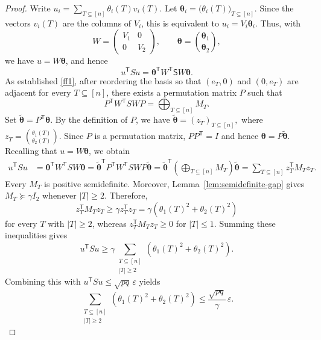 \documentclass[11pt]{article}
\numberwithin{equation}{section}
\theoremstyle{definition}
\theoremstyle{remark}
\begin{document}
\begin{proof}
Write
$
 u_i=\sum_{T\subseteq[n]}\theta_i(T)v_i(T).
$
Let
$
 \boldsymbol\theta_i
 =
 \bigl(\theta_i(T)\bigr)_{T\subseteq[n]}.
$
Since the vectors $v_i(T)$ are the columns of $V_i$, this is
equivalent to
$
 u_i=V_i\boldsymbol\theta_i.
$
Thus, with
$$
 W=
 \begin{pmatrix}V_1&0\\0&V_2\end{pmatrix},
 \qquad
 \boldsymbol\theta=
 \binom{\boldsymbol\theta_1}{\boldsymbol\theta_2},
$$
we have $u=W\boldsymbol\theta$, and hence
$$
 u^{\mathsf T} S u
 =
 \boldsymbol\theta^{\mathsf T}
 W^{\mathsf T}\mathsf S W
 \boldsymbol\theta.
$$
As established \eqref{ff1}, after reordering the basis so that $(e_T,0)$ and $(0,e_T)$ are
adjacent for every $T\subseteq[n]$, there exists a permutation matrix
$P$ such that
$$
 P^{\mathsf T}W^{\mathsf T} S WP
 =
 \bigoplus_{T\subseteq[n]}M_T.
$$
Set
$
 \widetilde{\boldsymbol\theta}
 =
 P^{\mathsf T}\boldsymbol\theta.
$
By the definition of $P$, we have
$
 \widetilde{\boldsymbol\theta}
 =
 (z_T)_{T\subseteq[n]},
$
where
$
 z_T
 =
 \binom{\theta_1(T)}{\theta_2(T)}.
$
Since $P$ is a permutation matrix, $PP^{\mathsf T}=I$ and hence
$\boldsymbol\theta=P\widetilde{\boldsymbol\theta}$. Recalling that
$u=W\boldsymbol\theta$, we obtain
$$
\begin{aligned}
 u^{\mathsf T} S u
 &=
 \boldsymbol\theta^{\mathsf T}
 W^{\mathsf T} S W
 \boldsymbol\theta=
 \widetilde{\boldsymbol\theta}^{\mathsf T}
 P^{\mathsf T}W^{\mathsf T} S WP
 \widetilde{\boldsymbol\theta}=
 \widetilde{\boldsymbol\theta}^{\mathsf T}
 \left(
  \bigoplus_{T\subseteq[n]}M_T
 \right)
 \widetilde{\boldsymbol\theta}=
 \sum_{T\subseteq[n]}z_T^{\mathsf T}M_Tz_T.
\end{aligned}
$$
Every $M_T$ is positive semidefinite. Moreover,
Lemma~\ref{lem:semidefinite-gap} gives
$
 M_T\succeq\gamma I_2
$
whenever $|T|\geq2$. Therefore,
$$
 z_T^{\mathsf T}M_Tz_T
 \geq
 \gamma z_T^{\mathsf T}z_T
 =
 \gamma\left(\theta_1(T)^2+\theta_2(T)^2\right)
$$
for every $T$ with $|T|\geq2$, whereas
$
z_T^{\mathsf T}M_Tz_T\geq0
$
for $|T|\leq1$. Summing these inequalities gives
$$
 u^{\mathsf T} S u
 \geq
 \gamma
 \sum_{\substack{T\subseteq[n]\\|T|\geq2}}
 \left(\theta_1(T)^2+\theta_2(T)^2\right).
$$
Combining this with
$
u^{\mathsf T} S u\leq\sqrt{pq}\,\varepsilon
$
yields
$$
 \sum_{\substack{T\subseteq[n]\\|T|\geq2}}
 \left(\theta_1(T)^2+\theta_2(T)^2\right)
 \leq
 \frac{\sqrt{pq}}{\gamma}\,\varepsilon.
$$



\end{proof}
\end{document}
